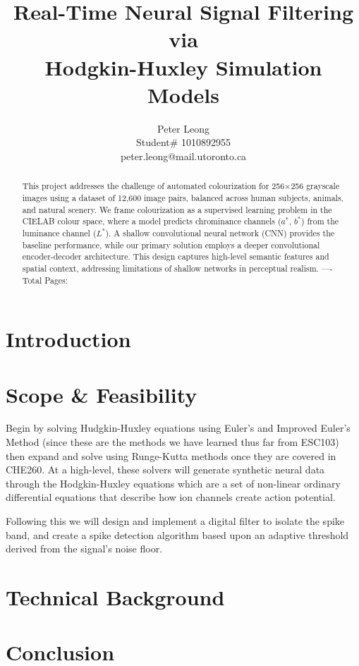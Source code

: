 \documentclass{article} %
\title{Real-Time Neural Signal Filtering via \\
Hodgkin-Huxley Simulation Models}
\author{Peter Leong \\
Student\# 1010892955 \\
peter.leong@mail.utoronto.ca \\
\AND
}
\begin{document}
\maketitle

\vspace{-6ex}

\begin{abstract}
This project addresses the challenge of automated colourization for 256$\times$256 grayscale images using a dataset of 12,600 image pairs, balanced across human subjects, 
animals, and natural scenery. We frame colourization as a supervised learning problem in the CIELAB colour space, where a model predicts chrominance channels ($a^*$, $b^*$) 
from the luminance channel ($L^*$). A shallow convolutional neural network (CNN) provides the baseline performance, while our primary solution employs a deeper convolutional 
encoder-decoder architecture. This design captures high-level semantic features and spatial context, addressing limitations of shallow networks in perceptual realism.
----Total Pages: \pageref{last_page}
\end{abstract}

\vspace{2ex}

\begin{multicols}{2}

\section{Introduction}

\section{Scope \& Feasibility}

Begin by solving Hudgkin-Huxley equations using Euler's and Improved Euler's Method (since these are the methods we have learned thus far from ESC103)
then expand and solve using Runge-Kutta methods once they are covered in CHE260. At a high-level, these solvers will generate synthetic neural data through
the Hodgkin-Huxley equations which are a set of non-linear ordinary differential equations that describe how ion channels create action potential.

Following this we will design and implement a digital filter to isolate the spike band, and create a spike detection algorithm based upon an adaptive threshold
derived from the signal's noise floor.

\section{Technical Background}

\section{Conclusion}

\label{last_page}

\newpage



\end{multicols}
\end{document}
